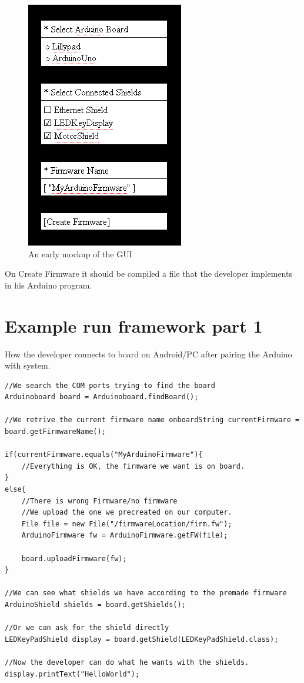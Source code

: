 \begin{figure}
\centering \includegraphics{img/architecture-mockupgui} \caption{An early mockup of the GUI}


\label{fig:architecture-mockupgui} 
\end{figure}


On Create Firmware it should be compiled a file that the developer
implements in his Arduino program.


\section{Example run framework part 1}

How the developer connects to board on Android/PC after pairing the
Arduino with system.

\javacode  {}
\begin{lstlisting}
//We search the COM ports trying to find the board
Arduinoboard board = Arduinoboard.findBoard();

//We retrive the current firmware name onboardString currentFirmware = board.getFirmwareName();

if(currentFirmware.equals("MyArduinoFirmware"){
    //Everything is OK, the firmware we want is on board.
}
else{
    //There is wrong Firmware/no firmware
    //We upload the one we precreated on our computer.
    File file = new File("/firmwareLocation/firm.fw");
    ArduinoFirmware fw = ArduinoFirmware.getFW(file);

    board.uploadFirmware(fw);
}

//We can see what shields we have according to the premade firmware
ArduinoShield shields = board.getShields();

//Or we can ask for the shield directly
LEDKeyPadShield display = board.getShield(LEDKeyPadShield.class);

//Now the developer can do what he wants with the shields.
display.printText("HelloWorld");
\end{lstlisting}

